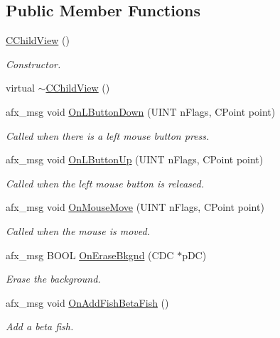\subsection*{Public Member Functions}
\begin{DoxyCompactItemize}
\item 
\hyperlink{class_c_child_view_aff5af7c162c10755edbe58f260ded6d4}{C\+Child\+View} ()
\begin{DoxyCompactList}\small\item\em Constructor. \end{DoxyCompactList}\item 
virtual \hyperlink{class_c_child_view_a5b033b5e0a130950719a173b86418698}{$\sim$\+C\+Child\+View} ()
\item 
afx\+\_\+msg void \hyperlink{class_c_child_view_af513a57c45ce8b9dcc09dd934e228534}{On\+L\+Button\+Down} (U\+I\+NT n\+Flags, C\+Point point)
\begin{DoxyCompactList}\small\item\em Called when there is a left mouse button press. \end{DoxyCompactList}\item 
afx\+\_\+msg void \hyperlink{class_c_child_view_ae81948a77ebf3744bd0f9449af57ee21}{On\+L\+Button\+Up} (U\+I\+NT n\+Flags, C\+Point point)
\begin{DoxyCompactList}\small\item\em Called when the left mouse button is released. \end{DoxyCompactList}\item 
afx\+\_\+msg void \hyperlink{class_c_child_view_ad3cb2f8d9fa9a6fb06989513dee5a8bc}{On\+Mouse\+Move} (U\+I\+NT n\+Flags, C\+Point point)
\begin{DoxyCompactList}\small\item\em Called when the mouse is moved. \end{DoxyCompactList}\item 
afx\+\_\+msg B\+O\+OL \hyperlink{class_c_child_view_a6060e6d09d522d345dcee5a01d41c1f0}{On\+Erase\+Bkgnd} (C\+DC $\ast$p\+DC)
\begin{DoxyCompactList}\small\item\em Erase the background. \end{DoxyCompactList}\item 
afx\+\_\+msg void \hyperlink{class_c_child_view_a3d54ea142fb2facf2f19fa6772346667}{On\+Add\+Fish\+Beta\+Fish} ()
\begin{DoxyCompactList}\small\item\em Add a beta fish. \end{DoxyCompactList}\item 

\end{DoxyCompactItemize}
